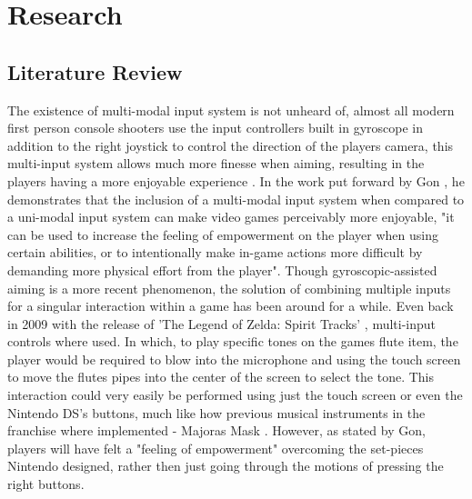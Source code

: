 \documentclass[11pt, a4paper]{article}
\begin{document}
\pagebreak
\section{Research}	
\subsection{Literature Review}	%
The existence of multi-modal input system is not unheard of, almost all modern first person console shooters use the input controllers built in gyroscope in addition to the right joystick to control the direction of the players camera, this multi-input system allows much more finesse when aiming, resulting in the players having a more enjoyable experience \cite{toktacs2019evaluation}. In the work put forward by Gon \cite{da2014multimodal}, he demonstrates that the inclusion of a multi-modal input system when compared to a uni-modal input system can make video games perceivably more enjoyable, "it can be used to increase the feeling of empowerment on the player when using certain abilities, or to intentionally make in-game actions more difficult by demanding more physical effort from the player". Though gyroscopic-assisted aiming is a more recent phenomenon, the solution of combining multiple inputs for a singular interaction within a game has been around for a while. Even back in 2009 with the release of 'The Legend of Zelda: Spirit Tracks' \cite{thelegendofzelda_spirittracks}, multi-input controls where used. In which, to play specific tones on the games flute item, the player would be required to blow into the microphone and using the touch screen to move the flutes pipes into the center of the screen to select the tone. This interaction could very easily be performed using just the touch screen or even the Nintendo DS's buttons, much like how previous musical instruments in the franchise where implemented - Majoras Mask \cite{thelegendofzelda_majorasmask}. However, as stated by Gon, players will have felt a "feeling of empowerment" overcoming the set-pieces Nintendo designed, rather then just going through the motions of pressing the right buttons.

\hfill
\end{document}
